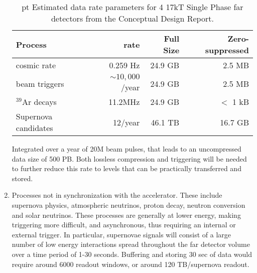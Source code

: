 \begin{enumerate}
\begin{table}[htp]
\begin{center}
\begin{tabular}{|l|r|r|r|}
\hline
Process&rate&Full Size&Zero-suppressed\\
\hline
cosmic rate&0.259 Hz&24.9 GB&2.5 MB\\
beam triggers&$\sim 10,000$/year&24.9 GB&2.5 MB\\
$^{39}$Ar decays&11.2MHz&24.9 GB&$<$ 1 kB\\
Supernova candidates &12/year&46.1 TB&16.7 GB\\
\hline
\end{tabular}
\end{center}
\caption{\normalsize {} pt Estimated data rate parameters for 4 17kT Single Phase far detectors from the Conceptual Design Report. }
\label{sw:bigone}
\end{table}%



Integrated over a year of 20M beam pulses, that leads to an uncompressed data size of 500 PB.  Both lossless compression and triggering will be needed to further reduce this rate to levels that can be practically transferred and stored.




\item Processes not in synchronization with the accelerator.  These include supernova physics, atmospheric neutrinos, proton decay, neutron conversion and solar neutrinos.  These processes are generally at lower energy, making triggering more difficult, and asynchronous, thus requiring an internal or external trigger.  In particular, supernovae signals will consist of a large number of low energy interactions spread throughout the far detector volume over a time period of 1-30 seconds. Buffering and storing 30 sec of data would require around 6000 readout windows, or around 120 TB/supernova readout.  




\end{enumerate}
